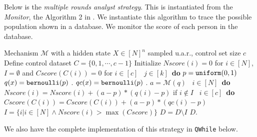
\begin{example}
    Below is the \emph{multiple rounds analyst strategy}. This is instantiated from the
    \emph{Monitor}, the Algorithm 2 in \cite{RogersRSSTW20}.
    We instantiate this algorithm to trace the possible population shown in a database.
    We monitor the score of each person in the database. 
    \begin{algorithm}
    \footnotesize
    \caption{The \emph{multiple rounds analyst strategy}}
    \label{alg:multiRound}
    \begin{algorithmic}
    \REQUIRE Mechanism $\mathcal{M}$ with a hidden state $X\in [N]^{n}$ sampled u.a.r., control set size $c$
    \STATE Define control dataset $C = \{0,1, \cdots, c - 1\}$
    \STATE Initialize $Nscore(i) = 0$ for $i \in [N]$, $I = \emptyset$ and $Cscore(C(i)) = 0$ for $i \in [c]$
    \ $j\in [k]$\ {\bf do} 
    \STATE {} $p=\mathtt{uniform}(0,1)$ 
    \STATE {} $q (x) = \mathtt{bernoulli} ( p )$ .
    \STATE {} $qc (x) = \mathtt{bernoulli} ( p )$ .
    \STATE {} $a = \mathcal{M}(q)$ 
    \STATE {}\ $i \in [N]$\ {\bf do}
    \STATE \qquad \qquad $Nscore(i) = Nscore(i) + (a - p)*(q (i) - p)$ if $i \notin I$
    \STATE {}\ $i \in [c]$\ {\bf do}
    \STATE \qquad \qquad $Cscore(C(i)) = Cscore(C(i)) + (a - p)*(qc (i) - p)$
    \STATE {} $I = \{i | i\in [N] \land Nscore(i) > \max(Cscore)\}$
    \STATE {} $D = D \setminus I$ 
    \RETURN $D$.
    \end{algorithmic}
    \end{algorithm}
    We also have the complete implementation of this strategy in {\tt QWhile} below.
    {\small
    }
\end{example}
